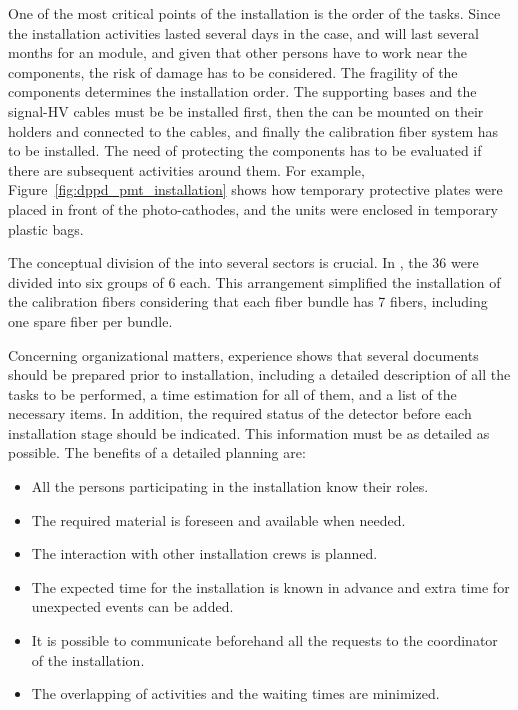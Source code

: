 One of the most critical points of the installation is the order of the tasks. Since the installation activities lasted several days in the  case, and will last several months for an  module, and given that other persons have to work near the  components, the risk of damage has to be considered. The fragility of the components determines the installation order. The  supporting bases and the signal-HV  cables must be be installed first, then the  can be mounted on their holders and connected to the cables, and finally the calibration fiber system has to be installed. The need of protecting the components has to be evaluated if there are subsequent activities around them. For example, Figure~\ref{fig:dppd_pmt_installation} shows how temporary protective plates were placed in front of the   photo-cathodes, and the  units were enclosed in temporary plastic bags. 

The conceptual division of the   into several sectors is crucial. In , the \num{36}  were divided into six groups of \num{6}  each. This arrangement simplified the installation of the calibration fibers considering that each fiber bundle has \num{7} fibers, including one spare fiber per bundle. 

Concerning organizational matters,  experience shows that several documents should be prepared prior to installation, including a detailed description of all the tasks to be performed, a time estimation for all of them, and a list of the necessary items. In addition, the required status of the detector before each installation stage should be indicated. This information must be as detailed as possible. The benefits of a detailed planning are:

\begin{itemize}
\item All the persons participating in the  installation know their roles.
\item The required material is foreseen and available when needed.
\item The interaction with other installation crews is planned.
\item The expected time for the installation is known in advance and extra time for unexpected events can be added.
\item It is possible to communicate beforehand all the requests to the coordinator of the installation.
\item The overlapping of activities and the waiting times are minimized. 
\end{itemize}
